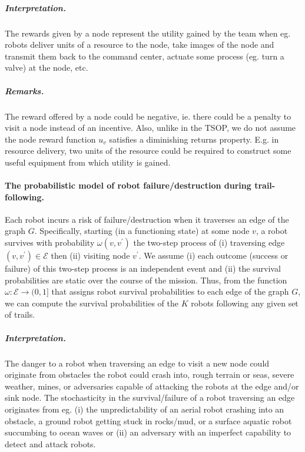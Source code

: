 \documentclass[11pt, oneside]{article}
\begin{document}
\vspace{-\baselineskip}
\subparagraph{Interpretation.} The rewards given by a node represent the utility gained by the team when eg. robots deliver units of a resource to the node, take images of the node and transmit them back to the command center, actuate some process (eg. turn a valve) at the node, etc. 

\vspace{-\baselineskip}
\subparagraph{Remarks.} The reward offered by a node could be negative, ie. there could be a penalty to visit a node instead of an incentive.
Also, unlike in the TSOP, we do not assume the node reward function $u_v$ satisfies a diminishing returns property. E.g. in resource delivery, two units of the resource could be required to construct some useful equipment from which utility is gained.


\paragraph{The probabilistic model of robot failure/destruction during trail-following.} 
Each robot incurs a risk of failure/destruction when it traverses an edge of the graph $G$.
Specifically, starting (in a functioning state) at some node $v$, a robot survives with probability $\omega(v, v^\prime)$ the two-step process of (i) traversing edge $(v, v^\prime) \in \mathcal{E}$ then (ii) visiting node $v^\prime$. 
We assume (i) each outcome (success or failure) of this two-step process is an independent event and (ii) the survival probabilities are static over the course of the mission. 
Thus, from the function $\omega: \mathcal{E} \rightarrow (0, 1]$ that assigns robot survival probabilities to each edge of the graph $G$, we can compute the survival probabilities of the $K$ robots following any given set of trails.



\vspace{-\baselineskip}
\subparagraph{Interpretation.} The danger to a robot when traversing an edge to visit a new node could originate from obstacles the robot could crash into, rough terrain or seas, severe weather, mines, or adversaries capable of attacking the robots at the edge and/or sink node.
The stochasticity in the survival/failure of a robot traversing an edge originates from eg. (i) the unpredictability of an aerial robot crashing into an obstacle, a ground robot getting stuck in rocks/mud, or a surface aquatic robot succumbing to ocean waves or (ii) an adversary with an imperfect capability to detect and attack robots.
\end{document}
